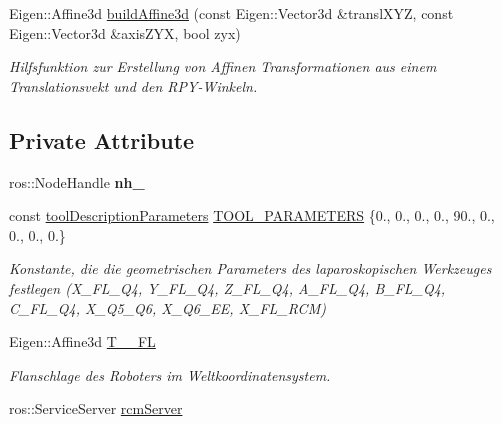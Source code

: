 \begin{DoxyCompactItemize}
Eigen\-::\-Affine3d \hyperlink{classGeometricKinematic_a9ed11aaa1279afe9f0f88e52e2f03689}{build\-Affine3d} (const Eigen\-::\-Vector3d \&transl\-X\-Y\-Z, const Eigen\-::\-Vector3d \&axis\-Z\-Y\-X, bool zyx)
\begin{DoxyCompactList}\small\item\em Hilfsfunktion zur Erstellung von Affinen Transformationen aus einem Translationsvekt und den R\-P\-Y-\/\-Winkeln. \end{DoxyCompactList}\end{DoxyCompactItemize}
\subsection*{Private Attribute}
\begin{DoxyCompactItemize}
\item 
\hypertarget{classGeometricKinematic_a3f7a8c38a4444d5fd6daf1da2067799e}{ros\-::\-Node\-Handle {\bfseries nh\-\_\-}}\label{classGeometricKinematic_a3f7a8c38a4444d5fd6daf1da2067799e}

\item 
\hypertarget{classGeometricKinematic_ab3d001b98257b76b051a4c9da08795c0}{const \hyperlink{structtoolDescriptionParameters}{tool\-Description\-Parameters} \hyperlink{classGeometricKinematic_ab3d001b98257b76b051a4c9da08795c0}{T\-O\-O\-L\-\_\-\-P\-A\-R\-A\-M\-E\-T\-E\-R\-S} \{0., 0., 0., 0., 90., 0., 0., 0., 0.\}}\label{classGeometricKinematic_ab3d001b98257b76b051a4c9da08795c0}

\begin{DoxyCompactList}\small\item\em Konstante, die die geometrischen Parameters des laparoskopischen Werkzeuges festlegen (X\-\_\-\-F\-L\-\_\-\-Q4, Y\-\_\-\-F\-L\-\_\-\-Q4, Z\-\_\-\-F\-L\-\_\-\-Q4, A\-\_\-\-F\-L\-\_\-\-Q4, B\-\_\-\-F\-L\-\_\-\-Q4, C\-\_\-\-F\-L\-\_\-\-Q4, X\-\_\-\-Q5\-\_\-\-Q6, X\-\_\-\-Q6\-\_\-\-E\-E, X\-\_\-\-F\-L\-\_\-\-R\-C\-M) \end{DoxyCompactList}\item 
\hypertarget{classGeometricKinematic_a8808661184ee6fe06704b505f27b4dbf}{Eigen\-::\-Affine3d \hyperlink{classGeometricKinematic_a8808661184ee6fe06704b505f27b4dbf}{T\-\_\-\_\-\-F\-L}}\label{classGeometricKinematic_a8808661184ee6fe06704b505f27b4dbf}

\begin{DoxyCompactList}\small\item\em Flanschlage des Roboters im Weltkoordinatensystem. \end{DoxyCompactList}\item 
\hypertarget{classGeometricKinematic_afcf0f9c5c410aaf3fe3aec2d812a42d4}{ros\-::\-Service\-Server \hyperlink{classGeometricKinematic_afcf0f9c5c410aaf3fe3aec2d812a42d4}{rcm\-Server}}\label{classGeometricKinematic_afcf0f9c5c410aaf3fe3aec2d812a42d4}


\end{DoxyCompactItemize}
